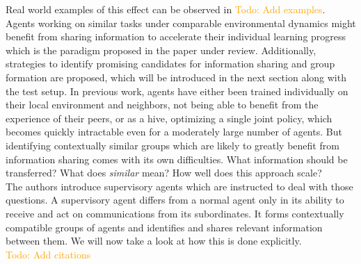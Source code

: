 \documentclass[letterpaper]{article}
\newcommand\todo[1]{\textcolor{orange}{Todo: #1}}
\begin{document}
Real world examples of this effect can be observed in \todo{Add examples}. Agents working on similar tasks under comparable environmental dynamics might benefit from sharing information to accelerate their individual learning progress which is the paradigm proposed in the paper under review. Additionally, strategies to identify promising candidates for information sharing and group formation are proposed, which will be introduced in the next section along with the test setup. In previous work, agents have either been trained individually on their local environment and neighbors, not being able to benefit from the experience of their peers, or as a hive, optimizing a single joint policy, which becomes quickly intractable even for a moderately large number of agents. But identifying contextually similar groups which are likely to greatly benefit from information sharing comes with its own difficulties. What information should be transferred? What does \textit{similar} mean? How well does this approach scale?\\
The authors introduce supervisory agents which are instructed to deal with those questions. A supervisory agent differs from a normal agent only in its ability to receive and act on communications from its subordinates. It forms contextually compatible groups of agents and identifies and shares relevant information between them. We will now take a look at how this is done explicitly.
\\\todo{Add citations}
\end{document}
